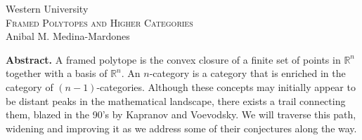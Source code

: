 \documentclass{article}
\begin{document}
	\pagestyle{empty}
	\begin{center}
		\large Western University \\
		\vspace*{5pt}
		\Large\textsc{Framed Polytopes and Higher Categories} \\
		\vspace*{10pt}
		\normalsize Anibal M. Medina-Mardones \\
	\end{center}
	\textbf{Abstract.}
	A framed polytope is the convex closure of a finite set of points in $\mathbb{R}^n$ together with a basis of $\mathbb{R}^n$.
	An $n$-category is a category that is enriched in the category of $(n-1)$-categories. Although these concepts may initially appear to be distant peaks in the mathematical landscape, there exists a trail connecting them, blazed in the 90's by Kapranov and Voevodsky. We will traverse this path, widening and improving it as we address some of their conjectures along the way.
\end{document}
